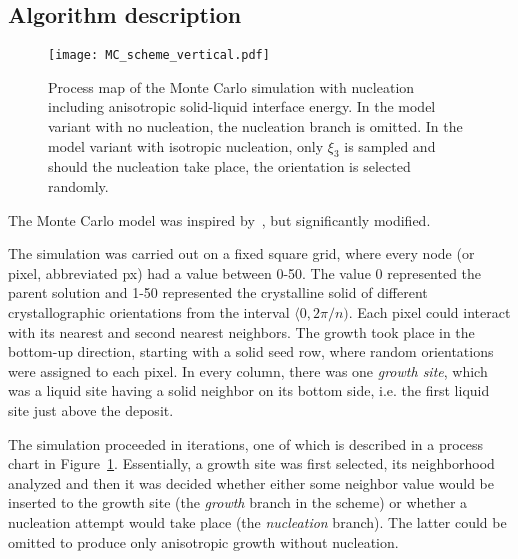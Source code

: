 \subsection{Algorithm description}
\begin{figure}
	\centering
	\texttt{[image: MC\_scheme\_vertical.pdf]}
	\caption[Process map of the Monte Carlo simulation with nucleation including anisotropic solid-liquid interface energy]{Process map of the Monte Carlo simulation with nucleation including anisotropic solid-liquid interface energy. In the model variant with no nucleation, the nucleation branch is omitted. In the model variant with isotropic nucleation, only $\xi_3$ is sampled and should the nucleation take place, the orientation is selected randomly.}
	\label{fig_MCscheme}
\end{figure}

The Monte Carlo model was inspired by~\cite{Li1997_1,Li1997_2}, but significantly modified. 

The simulation was carried out on a fixed square grid, where every node (or pixel, abbreviated px) had a value between 0-50. The value 0 represented the parent solution and 1-50 represented the crystalline solid of different crystallographic orientations from the interval $\langle0,2\pi/n)$. Each pixel could interact with its nearest and second nearest neighbors. The growth took place in the bottom-up direction, starting with a solid seed row, where random orientations were assigned to each pixel. In every column, there was one \textit{growth site}, which was a liquid site having a solid neighbor on its bottom side, i.e. the first liquid site just above the deposit.

The simulation proceeded in iterations, one of which is described in a process chart in Figure~\ref{fig_MCscheme}. Essentially, a growth site was first selected, its neighborhood analyzed and then it was decided whether either some neighbor value would be inserted to the growth site (the \textit{growth} branch in the scheme) or whether a nucleation attempt would take place (the \textit{nucleation} branch). The latter could be omitted to produce only anisotropic growth without nucleation.

